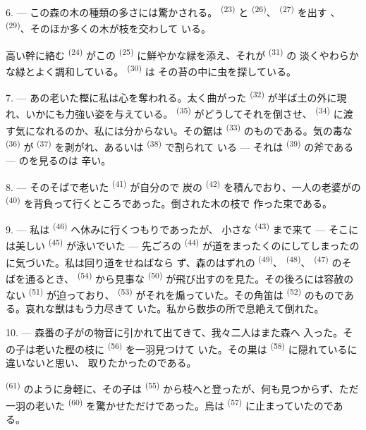 6. --- この森の木の種類の多さには驚かされる。 \textsuperscript{(23)} と
 \textsuperscript{(26)}、 \textsuperscript{(27)} を出す
、 \textsuperscript{(29)}、そのほか多くの木が枝を交わして
いる。

高い幹に絡む \textsuperscript{(24)} がこの
\textsuperscript{(25)} に鮮やかな緑を添え、それが \textsuperscript{(31)} の
淡くやわらかな緑とよく調和している。 \textsuperscript{(30)} は
その苔の中に虫を探している。

\VUsaut{3.0mm}
\VUsaut{3.0mm}

7. --- あの老いた樫に私は心を奪われる。太く曲がった
\textsuperscript{(32)} が半ば土の外に現れ、いかにも力強い姿を与えている。
 \textsuperscript{(35)} がどうしてそれを倒させ、
\textsuperscript{(34)} に渡す気になれるのか、私には分からない。その鋸は
 \textsuperscript{(33)} のものである。気の毒な \textsuperscript{(36)} が
\textsuperscript{(37)} を剥がれ、あるいは \textsuperscript{(38)} で割られて
いる --- それは \textsuperscript{(39)} の斧である --- のを見るのは
辛い。

8. --- そのそばで老いた \textsuperscript{(41)} が自分ので
炭の \textsuperscript{(42)} を積んでおり、一人の老婆がの
 \textsuperscript{(40)} を背負って行くところであった。倒された木の枝で
作った束である。

\VUsaut{3.0mm}
\VUsaut{3.0mm}

9. --- 私は \textsuperscript{(46)} へ休みに行くつもりであったが、
小さな \textsuperscript{(43)} まで来て --- そこには美しい
\textsuperscript{(45)} が泳いでいた --- 先ごろの \textsuperscript{(44)}
が道をまったくのにしてしまったのに気づいた。私は回り道をせねばなら
ず、森のはずれの \textsuperscript{(49)}、
\textsuperscript{(48)}、 \textsuperscript{(47)} のそばを通るとき、
 \textsuperscript{(54)} から見事な \textsuperscript{(50)}
が飛び出すのを見た。その後ろには容赦のない \textsuperscript{(51)}
が迫っており、 \textsuperscript{(53)} がそれを煽っていた。その角笛は
 \textsuperscript{(52)} のものである。哀れな獣はもう力尽きて
いた。私から数歩の所で息絶えて倒れた。

10. --- 森番の子がの物音に引かれて出てきて、我々二人はまた森へ
入った。その子は老いた樫の枝に \textsuperscript{(56)} を一羽見つけて
いた。その巣は \textsuperscript{(58)} に隠れているに違いないと思い、
取りたかったのである。

 \textsuperscript{(61)} のように身軽に、その子は
\textsuperscript{(55)} から枝へと登ったが、何も見つからず、ただ一羽の老いた
 \textsuperscript{(60)} を驚かせただけであった。烏は
\textsuperscript{(57)} に止まっていたのである。
\VUsaut{4.0mm}
\VUfilet{22mm}
